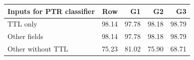 \centering\footnotesize
\begin{tabular}{@{}lrrrr@{}}
\toprule
Inputs for PTR classifier & Row & G1 & G2 & G3\\\midrule
TTL only & 98.14 & 97.78 & 98.18 & 98.79\\
Other fields & 98.14 & 97.78 & 98.18 & 98.79\\
Other without TTL & 75.23 & 81.02 & 75.90 & 68.71\\
\bottomrule
\end{tabular}
